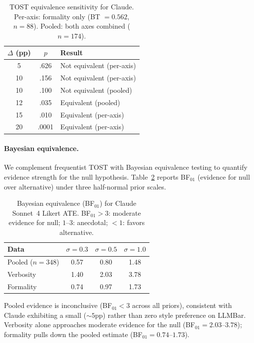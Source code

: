 \begin{table}[h]
\centering
\small
\caption{TOST equivalence sensitivity for Claude. Per-axis: formality only (BT $= 0.562$, $n = 88$). Pooled: both axes combined ($n = 174$).}
\label{tab:tost_sensitivity}
\begin{tabular}{ccl}
\toprule
$\Delta$ (pp) & $p$ & Result \\
\midrule
5 & .626 & Not equivalent (per-axis) \\
10 & .156 & Not equivalent (per-axis) \\
10 & .100 & Not equivalent (pooled) \\
12 & .035 & Equivalent (pooled) \\
15 & .010 & Equivalent (per-axis) \\
20 & .0001 & Equivalent (per-axis) \\
\bottomrule
\end{tabular}
\end{table}

\paragraph{Bayesian equivalence.}
We complement frequentist TOST with Bayesian equivalence testing to quantify evidence strength for the null hypothesis.
Table~\ref{tab:bayesian_equiv} reports BF$_{01}$ (evidence for null over alternative) under three half-normal prior scales.

\begin{table}[h]
\centering
\small
\caption{Bayesian equivalence (BF$_{01}$) for Claude Sonnet~4 Likert ATE. BF$_{01} > 3$: moderate evidence for null; $1$--$3$: anecdotal; $< 1$: favors alternative.}
\label{tab:bayesian_equiv}
\begin{tabular}{@{}lccc@{}}
\toprule
Data & $\sigma = 0.3$ & $\sigma = 0.5$ & $\sigma = 1.0$ \\
\midrule
Pooled ($n = 348$) & 0.57 & 0.80 & 1.48 \\
Verbosity & 1.40 & 2.03 & 3.78 \\
Formality & 0.74 & 0.97 & 1.73 \\
\bottomrule
\end{tabular}
\end{table}

Pooled evidence is inconclusive (BF$_{01} < 3$ across all priors), consistent with Claude exhibiting a small (${\sim}5$pp) rather than zero style preference on LLMBar.
Verbosity alone approaches moderate evidence for the null (BF$_{01} = 2.03$--$3.78$); formality pulls down the pooled estimate (BF$_{01} = 0.74$--$1.73$).

